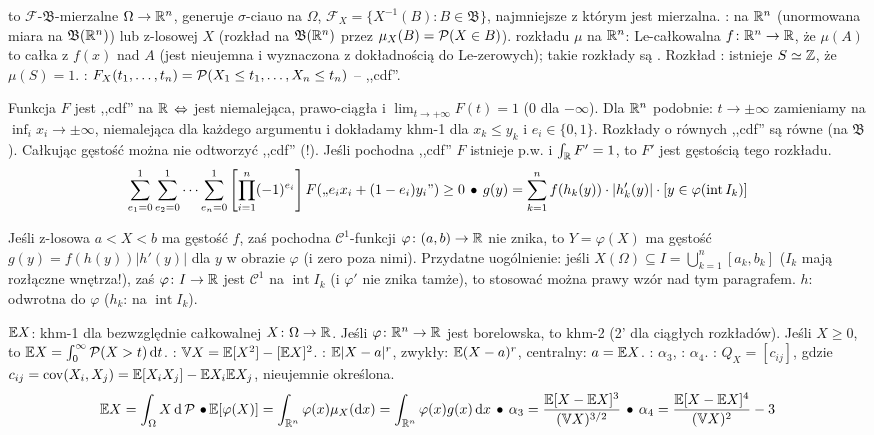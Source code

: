   to $\mathcal F$-$\mathfrak B$-mierzalne $\Omega \to \mathbb{R}^n$, generuje $\sigma$-ciauo na $\Omega$, $\mathcal F_X = \{X^{-1}(B) : B \in \mathfrak B\}$, najmniejsze z którym jest mierzalna.
: na $\mathbb{R}^n$ (unormowana miara na $\mathfrak B(\mathbb{R}^n)$) lub z-losowej $X$ (rozkład na $\mathfrak B(\mathbb{R}^n)$ przez $\mu_X (B) = \operatorname{\mathcal{P}}(X \in B)$).
 rozkładu $\mu$ na $\mathbb{R}^n$: Le-całkowalna $f \colon \mathbb{R}^n \to \mathbb{R}$, że $\mu(A)$ to całka z $f(x)$ nad $A$ (jest nieujemna i wyznaczona z dokładnością do Le-zerowych); takie rozkłady są .
Rozkład : istnieje $S \simeq \mathbb{Z}$, że $\mu(S) = 1$.
: $F_X(t_1, \dots, t_n) = \operatorname{\mathcal{P}} (X_1 \le t_1, \dots, X_n \le t_n)$ -- ,,cdf''.

Funkcja $F$ jest ,,cdf''  na  $\mathbb{R}$  $\Leftrightarrow$ jest niemalejąca, prawo-ciągła i $\lim_{t \to +\infty} F(t) = 1$ ($0$ dla $-\infty$).
Dla $\mathbb{R}^n$ podobnie:  $t \to \pm \infty$ zamieniamy na $\inf_i x_i \to \pm \infty$, niemalejąca dla każdego argumentu i dokładamy khm-1 dla $x_k \le y_k$ i $e_i \in \{0,1\}$.
Rozkłady o równych ,,cdf'' są równe (na $\mathfrak B$).
Całkując gęstość można nie odtworzyć ,,cdf'' (!).
Jeśli pochodna ,,cdf'' $F$ istnieje p.w. i $\int_{\mathbb{R}} F' = 1$, to $F'$ jest gęstością tego rozkładu.
\[
	\sum_{e_1=0}^1 \sum_{e_2=0}^1 \cdots \sum_{e_n = 0}^1 \left[\prod_{i=1}^n (-1)^{e_i}\right] F (\mbox{,,} e_ix_i + (1-e_i)y_i\mbox{''}) \ge 0 \, \bullet \,
	g(y) = \sum_{k=1}^n f(h_k(y)) \cdot {|h_k'(y)|} \cdot [y \in \varphi(\operatorname{int} I_k)]
\]

Jeśli  z-losowa $a < X < b$ ma gęstość $f$, zaś pochodna $\mathscr C^1$-funkcji $\varphi \colon (a,b) \to \mathbb{R}$ nie znika, to $Y = \varphi(X)$ ma gęstość $g(y) = f(h(y)) |h'(y)|$ dla $y$ w obrazie $\varphi$ (i zero poza nimi).
Przydatne uogólnienie: jeśli $X (\Omega) \subseteq I = \bigcup_{k=1}^n [a_k, b_k]$ ($I_k$ mają rozłączne wnętrza!), zaś $\varphi \colon I \to \mathbb{R}$ jest $\mathscr C^1$ na $\operatorname{int} I_k$ (i $\varphi'$ nie znika tamże), to stosować można prawy wzór nad tym paragrafem. \hfill $h$: odwrotna do $\varphi$ ($h_k$: na $\operatorname{int} I_k$).

  $\mathbb{E} X$: khm-1 dla bezwzględnie całkowalnej $X \colon \Omega \to \mathbb{R}$.
Jeśli $\varphi \colon \mathbb{R}^n \to \mathbb{R}$ jest borelowska, to khm-2 (2' dla ciągłych rozkładów).
Jeśli $X \ge 0$, to $\mathbb{E} X = \int_0^\infty \operatorname{\mathcal{P}} (X > t) \,\textrm{d} t$.
: $\mathbb{V} X = \mathbb{E} [X^2] - [\mathbb{E} X]^2$.
: $\mathbb{E} |X - a|^r$, zwykły: $\mathbb{E} (X-a)^r$, centralny: $a = \mathbb{E} X$.
: $\alpha_3$, : $\alpha_4$.
: $Q_X = [c_{ij}]$, gdzie $c_{ij} = \operatorname{cov} (X_i, X_j) = \mathbb{E} [X_iX_j] - \mathbb{E} X_i \mathbb{E} X_j$, nieujemnie określona.
\[
	\mathbb{E} X = \int_\Omega X \,\textrm{d}\operatorname{\mathcal{P}} \, \bullet \,
	\mathbb{E} [\varphi(X)] = \int_{\mathbb{R}^n} \varphi(x) \mu_X (\textrm{d} x) = \int_{\mathbb{R}^n} \varphi(x) g(x) \, \textrm{d} x \, \bullet \,
	\alpha_3 = \frac{\mathbb{E} [X - \mathbb{E} X]^3}{(\mathbb{V} X)^{3/2}} \, \bullet \,
	\alpha_4 = \frac{\mathbb{E} [X - \mathbb{E} X]^4}{(\mathbb{V} X)^2} - 3
\]

